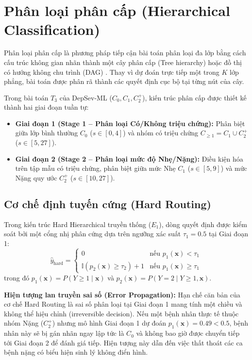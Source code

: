 \section{Phân loại phân cấp (Hierarchical Classification)}
\label{sec:ly-thuyet-hierarchical}

Phân loại phân cấp là phương pháp tiếp cận bài toán phân loại đa lớp bằng cách cấu trúc không gian nhãn thành một cây phân cấp (Tree hierarchy) hoặc đồ thị có hướng không chu trình (DAG) \cite{silla2011survey}. Thay vì dự đoán trực tiếp một trong $K$ lớp phẳng, bài toán được phân rã thành các quyết định cục bộ tại từng nút của cây.

Trong bài toán $T_3$ của DepSev-ML ($C_0, C_1, C_2^+$), kiến trúc phân cấp được thiết kế thành hai giai đoạn tuần tự:
\begin{itemize}
    \item \textbf{Giai đoạn 1 (Stage 1 -- Phân loại Có/Không triệu chứng):} Phân biệt giữa lớp bình thường $C_0$ ($s \in [0, 4]$) và nhóm có triệu chứng $C_{\ge 1} = C_1 \cup C_2^+$ ($s \in [5, 27]$).
    \item \textbf{Giai đoạn 2 (Stage 2 -- Phân loại mức độ Nhẹ/Nặng):} Điều kiện hóa trên tập mẫu có triệu chứng, phân biệt giữa mức Nhẹ $C_1$ ($s \in [5, 9]$) và mức Nặng quy ước $C_2^+$ ($s \in [10, 27]$).
\end{itemize}

\subsection{Cơ chế định tuyến cứng (Hard Routing)}
Trong kiến trúc Hard Hierarchical truyền thống ($E_1$), dòng quyết định được kiểm soát bởi một cổng nhị phân cứng dựa trên ngưỡng xác suất $\tau_1 = 0.5$ tại Giai đoạn 1:
\begin{equation}
    \hat{y}_{\text{hard}} = \begin{cases} 0 & \text{nếu } p_1(\mathbf{x}) < \tau_1 \\ \mathbb{I}(p_2(\mathbf{x}) \ge \tau_2) + 1 & \text{nếu } p_1(\mathbf{x}) \ge \tau_1 \end{cases}
\end{equation}
trong đó $p_1(\mathbf{x}) = P(Y \ge 1 \mid \mathbf{x})$ và $p_2(\mathbf{x}) = P(Y = 2 \mid Y \ge 1, \mathbf{x})$.

\textbf{Hiện tượng lan truyền sai số (Error Propagation):} Hạn chế căn bản của cơ chế Hard Routing là sai số phân loại tại Giai đoạn 1 mang tính một chiều và không thể hiệu chỉnh (irreversible decision). Nếu một bệnh nhân thực tế thuộc nhóm Nặng ($C_2^+$) nhưng mô hình Giai đoạn 1 dự đoán $p_1(\mathbf{x}) = 0.49 < 0.5$, bệnh nhân này sẽ bị gán nhãn ngay lập tức là $C_0$ và không bao giờ được chuyển tiếp tới Giai đoạn 2 để đánh giá tiếp. Hiện tượng này dẫn đến việc thất thoát các ca bệnh nặng có biểu hiện sinh lý không điển hình.

